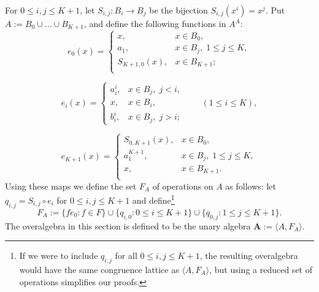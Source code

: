 \documentclass[cm,dissertation,actual,final]{uhthesis}
\theoremstyle{plain}
\theoremstyle{definition}
\theoremstyle{remark}
\numberwithin{theorem}{section}
\numberwithin{claim}{chapter}
\numberwithin{equation}{section}
\numberwithin{conjecture}{chapter}
\newcommand{\<}{\ensuremath{\langle}}
\renewcommand{\>}{\ensuremath{\rangle}}
\renewcommand{\leq}{\ensuremath{\leqslant}}
\newcommand{\supi}{\ensuremath{^{i}}}
\newcommand{\supj}{\ensuremath{^{j}}}
\newcommand{\0}{\ensuremath{\mathbf{0}}}
\newcommand{\1}{\ensuremath{\mathbf{1}}}
\newcommand{\2}{\ensuremath{\mathbf{2}}}
\newcommand{\3}{\ensuremath{\mathbf{3}}}
\newcommand{\4}{\ensuremath{\mathbf{4}}}
\newcommand{\5}{\ensuremath{\mathbf{5}}}
\newcommand{\bA}{\ensuremath{\mathbf{A}}}
\begin{document}
For $0\leq i, j \leq K+1$, let $S_{i,j}:B_i \rightarrow B_j $ be the 
bijection $S_{i,j}(x\supi)=x\supj$.
Put $A:=B_0\cup \dots\cup B_{K+1}$, and define the following functions in $A^A$:
\[
e_0(x)=
\begin{cases}
  x, & x\in B_0,\\
  a_1, &x\in B_j,\; 1\leq j \leq K,\\
  S_{K+1,0}(x), &x\in B_{K+1};\\
\end{cases}
\]

\[
e_i(x)=
\begin{cases}
  a_i^{i}, &x\in B_j,\; j<i,\\
  x, &x\in B_i,\\
  b_i^{i},&x\in B_j, \;j>i;
\end{cases} \qquad (1\leq i\leq K),
\]

\[
e_{K+1}(x)=
\begin{cases}
  S_{0,K+1}(x), &x\in B_0,\\
  a_{1}^{K+1}, &x\in B_j,\; 1\leq j \leq K,\\
  x, &x \in B_{K+1}.\\
\end{cases}
\]
Using these maps we define the set $F_A$ of operations on $A$ as follows: let
$q_{i,j}=S_{i,j}\circ e_i$ 
for $0\leq i, j\leq K+1$ and
define\footnote{If we were to include $q_{i,j}$
  for all $0\leq i, j\leq K+1$, the resulting overalgebra would have the same
  congruence lattice as $\<A, F_A\>$, but using a reduced set of
  operations simplifies our proofs.}  
\[
F_A := \{f e_0 : f\in F\}  \cup \{q_{i,0} : 0\leq i \leq K+1\}\cup \{q_{0,j} : 1\leq j \leq K+1\}.
\]
The overalgebra in this section is defined to be the unary algebra 
$\bA := \< A, F_A\>$.   
\end{document}
